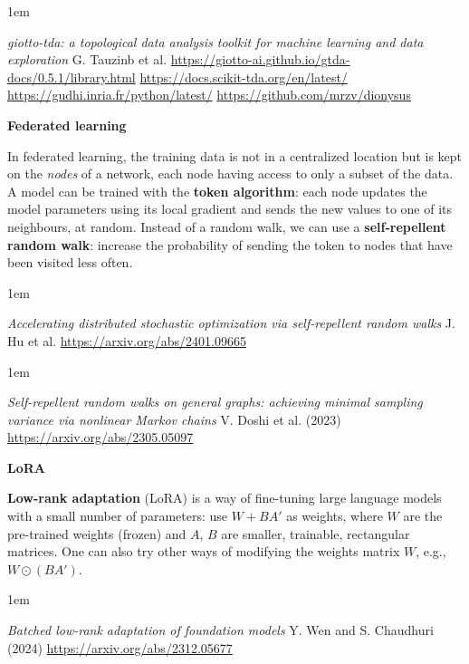 \documentclass[a5paper]{article}
\let\d\textbf
\newenvironment{reference}{%
  \medskip\goodbreak
  \parskip 0pt
  \raggedright
  \leftskip 1em
  \obeylines
}{\par\medskip\goodbreak}
\def\subsection#1{{\par\bigskip\goodbreak\large\bfseries #1\par}}
\begin{document}
\begin{reference}
  \emph{giotto-tda: a topological data analysis toolkit for machine learning and data exploration}
  G. Tauzinb et al.
  \url{https://giotto-ai.github.io/gtda-docs/0.5.1/library.html}
  \url{https://docs.scikit-tda.org/en/latest/}
  \url{https://gudhi.inria.fr/python/latest/}
  \url{https://github.com/mrzv/dionysus}
\end{reference}
  
\subsection{Federated learning}

In federated learning, the training data is not in a centralized location
but is kept on the \emph{nodes} of a network, each node having access to only a subset of the data.
A model can be trained with the \d{token algorithm}:
each node updates the model parameters using its local gradient
and sends the new values to one of its neighbours, at random.
Instead of a random walk, we can use a \d{self-repellent random walk}:
increase the probability of sending the token to nodes that have been visited less often.

\begin{reference}
  \emph{Accelerating distributed stochastic optimization via self-repellent random walks}
  J. Hu et al.
  \url{https://arxiv.org/abs/2401.09665}
\end{reference}

\begin{reference}
  \emph{Self-repellent random walks on general graphs: achieving minimal sampling variance via nonlinear Markov chains}
  V. Doshi et al. (2023)
  \url{https://arxiv.org/abs/2305.05097}
\end{reference}

\subsection{LoRA}

\d{Low-rank adaptation} (LoRA) is a way of fine-tuning large language models
with a small number of parameters:
use $W+BA'$ as weights, where $W$ are the pre-trained weights (frozen)
and $A$, $B$ are smaller, trainable, rectangular matrices.
One can also try other ways of modifying the weights matrix $W$, e.g., $W\odot(BA')$.

\begin{reference}
  \emph{Batched low-rank adaptation of foundation models}
  Y. Wen and S. Chaudhuri (2024)
  \url{https://arxiv.org/abs/2312.05677}
\end{reference}
\end{document}
